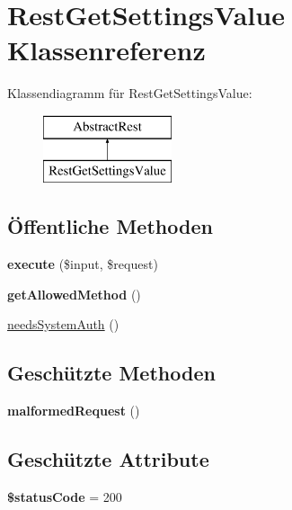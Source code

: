 \hypertarget{class_rest_get_settings_value}{}\section{Rest\+Get\+Settings\+Value Klassenreferenz}
\label{class_rest_get_settings_value}
Klassendiagramm für Rest\+Get\+Settings\+Value\+:\begin{figure}[H]
\begin{center}
\leavevmode
\includegraphics[height=2.000000cm]{class_rest_get_settings_value}
\end{center}
\end{figure}
\subsection*{Öffentliche Methoden}
\begin{DoxyCompactItemize}
\item 
\mbox{\label{class_rest_get_settings_value_ab87ec1c22f7b8a38deac85cf33fd29a6}} 
{\bfseries execute} (\$input, \$request)
\item 
\mbox{\label{class_rest_get_settings_value_a676e0aec619935b69c214388d4df045c}} 
{\bfseries get\+Allowed\+Method} ()
\item 
\mbox{\hyperlink{class_rest_get_settings_value_afb390345641cf356b8e5b2391bfa2e4b}{needs\+System\+Auth}} ()
\end{DoxyCompactItemize}
\subsection*{Geschützte Methoden}
\begin{DoxyCompactItemize}
\item 
\mbox{\label{class_rest_get_settings_value_a6bb2b5b816c08cc7b37d542cfd3e9fee}} 
{\bfseries malformed\+Request} ()
\end{DoxyCompactItemize}
\subsection*{Geschützte Attribute}
\begin{DoxyCompactItemize}
\item 
\mbox{\label{class_rest_get_settings_value_aa0b5cef773770b4aaae311cd881817e2}} 
{\bfseries \$status\+Code} = 200
\end{DoxyCompactItemize}


